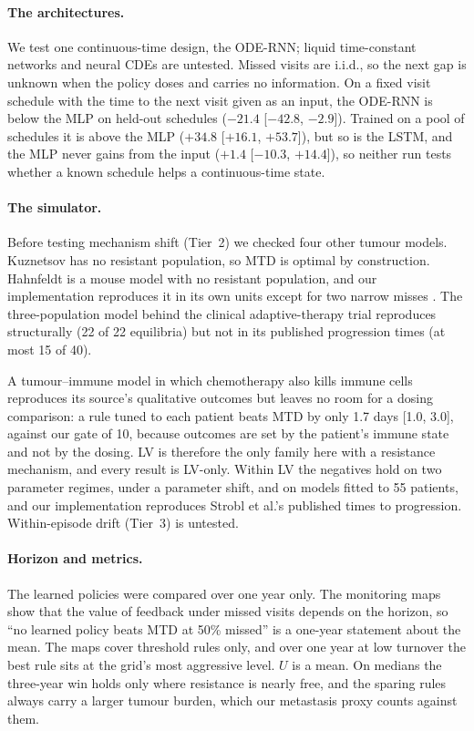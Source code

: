 \documentclass[10pt]{article}
\renewcommand{\cite}{\citep}
\begin{document}
\paragraph{The architectures.} We test one continuous-time design, the ODE-RNN;
liquid time-constant networks \cite{hasani2021} and neural CDEs
\cite{kidger2020} are untested. Missed visits are i.i.d., so the next gap is
unknown when the policy doses and carries no information. On a fixed visit
schedule with the time to the next visit given as an input, the ODE-RNN is below
the MLP on held-out schedules ($-21.4$ [$-42.8$, $-2.9$]). Trained on a pool of
schedules it is above the MLP ($+34.8$ [$+16.1$, $+53.7$]), but so is the LSTM,
and the MLP never gains from the input ($+1.4$ [$-10.3$, $+14.4$]), so neither
run tests whether a known schedule helps a continuous-time state.


\paragraph{The simulator.} Before testing mechanism shift (Tier~2) we checked
four other tumour models. Kuznetsov has no resistant population, so MTD is
optimal by construction. Hahnfeldt is a mouse model with no resistant
population, and our implementation reproduces it in its own units except for
two narrow misses \cite{hahnfeldt1999}. The three-population model behind the
clinical adaptive-therapy trial \cite{zhang2017} reproduces structurally (22 of
22 equilibria) but not in its published progression times (at most 15 of 40).

A tumour--immune model in which chemotherapy also kills immune cells
\cite{depillis2006} reproduces its source's qualitative outcomes but leaves no
room for a dosing comparison: a rule tuned to each patient beats MTD by only 1.7
days [1.0, 3.0], against our gate of 10, because outcomes are set by the
patient's immune state and not by the dosing.
LV is therefore the only family here with a resistance mechanism, and every
result is LV-only. Within LV the negatives hold on two parameter regimes, under
a parameter shift, and on models fitted to 55 patients, and our implementation
reproduces Strobl et al.'s published times to progression. Within-episode drift
(Tier~3) is untested.

\paragraph{Horizon and metrics.} The learned policies were compared over one
year only. The monitoring maps show that the value of feedback under missed
visits depends on the horizon, so ``no learned policy beats MTD at 50\% missed''
is a one-year statement about the mean. The maps cover threshold rules only, and
over one year at low turnover the best rule sits at the grid's most aggressive
level. $U$ is a mean. On medians the three-year win holds only where resistance
is nearly free, and the sparing rules always carry a larger tumour burden, which
our metastasis proxy counts against them.
\end{document}
